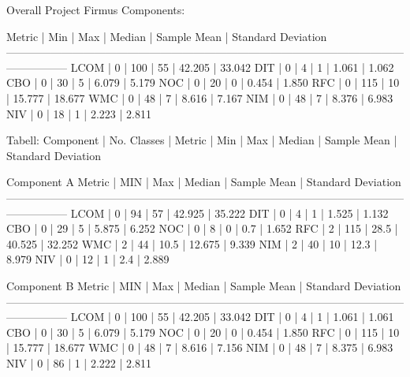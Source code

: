 Overall Project Firmus Components:

Metric		|		Min 		|		Max 		| 		Median 		| 		Sample Mean 		| 		Standard Deviation
-----------------------------------------------------------------------------------------------------------------------------
LCOM		|		0			|		100			|		55			|		42.205				|		33.042
DIT 		|		0			|		4			|		1			|		1.061				|		1.062
CBO 		|		0			|		30			|		5			|		6.079				|		5.179
NOC 		|		0			|		20			|		0			|		0.454				|		1.850
RFC 		|		0			|		115			|		10  		|		15.777				|		18.677
WMC 		|		0			|		48			|		7			|		8.616				|		7.167
NIM			|		0			|		48			|		7			|		8.376				|		6.983
NIV 		|		0			|		18			|		1 			|		2.223				|		2.811








Tabell: 
Component | No. Classes | Metric | Min | Max | Median | Sample Mean | Standard Deviation








Component A
Metric		|		MIN 		|		Max 		| 		Median 		| 		Sample Mean 		| 		Standard Deviation
-----------------------------------------------------------------------------------------------------------------------------
LCOM		|		0			|		94			|		57			|		42.925				|		35.222
DIT 		|		0			|		4			|		1			|		1.525				|		1.132
CBO 		|		0			|		29			|		5			|		5.875				|		6.252
NOC 		|		0			|		8			|		0			|		0.7					|		1.652
RFC 		|		2			|		115			|		28.5		|		40.525				|		32.252
WMC 		|		2			|		44			|		10.5		|		12.675				|		9.339
NIM			|		2			|		40			|		10			|		12.3				|		8.979
NIV 		|		0			|		12			|		1 			|		2.4					|		2.889









Component B
Metric		|		MIN 		|		Max 		| 		Median 		| 		Sample Mean 		| 		Standard Deviation
-----------------------------------------------------------------------------------------------------------------------------
LCOM		|		0			|		100			|		55			|		42.205				|		33.042
DIT 		|		0			|		4			|		1			|		1.061				|		1.061
CBO 		|		0			|		30			|		5			|		6.079				|		5.179
NOC 		|		0			|		20			|		0			|		0.454				|		1.850
RFC 		|		0			|		115			|		10 			|		15.777				|		18.677
WMC 		|		0			|		48			|		7			|		8.616				|		7.156
NIM			|		0			|		48			|		7			|		8.375				|		6.983
NIV 		|		0			|		86			|		1 			|		2.222				|		2.811











